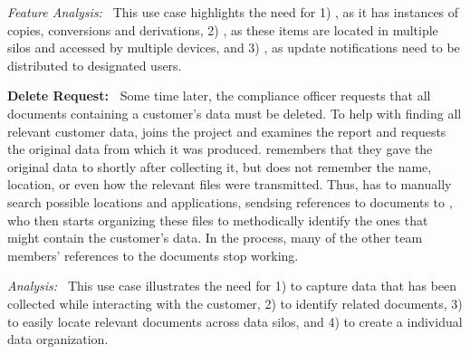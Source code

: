 \noindent\textit{Feature Analysis:~}
This use case highlights the need for 1) \usecasedatarelationship, as it has instances of copies, conversions and derivations, 2) \usecasecrosssilosearch, as these items are located in multiple silos and accessed by multiple devices, and 3) \usecasenotifications, as update notifications need to be distributed to designated users.

\noindent\textbf{Delete Request:~}
Some time later, the compliance officer requests that all documents containing a customer's data must be deleted.
To help with finding all relevant customer data, \persb joins the project and examines the report and requests the original data from which it was produced.
\persa remembers that they gave the original data to \persc shortly after collecting it, but does not remember the name, location, or even how the relevant files were transmitted. Thus, \persa has to manually search possible locations and applications, sendsing references to documents to \persb, who then starts organizing these files to methodically identify the ones that might contain the customer's data. In the process, many of the other team members' references to the documents stop working.

\noindent\textit{Analysis:~}
This use case illustrates the need for 1) \usecaseactivitycontext to capture
data that has been collected while interacting with the customer, 2)
\usecasedatarelationship to identify related documents, 3)
\usecasecrosssilosearch to easily locate relevant documents across data silos,
and 4) \usecasepersnamespace to create a individual data organization.



